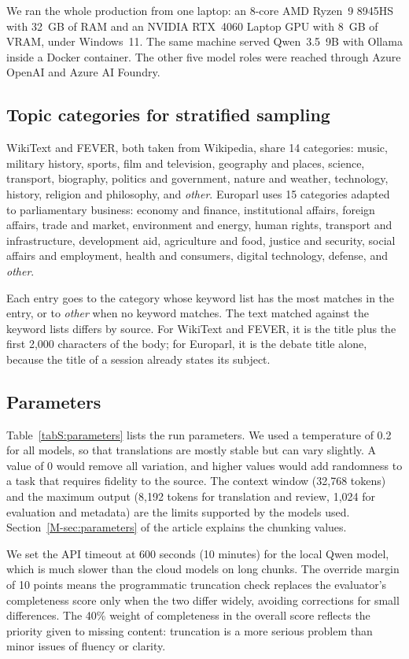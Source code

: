 \documentclass[11pt]{article}
\DeclareRobustCommand{\mainref}[1]{\ref*{M-#1}}
\begin{document}
We ran the whole production from one laptop: an 8-core AMD Ryzen~9 8945HS with 32~GB of RAM and an NVIDIA RTX~4060 Laptop GPU with 8~GB of VRAM, under Windows~11. The same machine served Qwen~3.5~9B with Ollama inside a Docker container. The other five model roles were reached through Azure OpenAI and Azure AI Foundry.

\subsection{Topic categories for stratified sampling}
\label{secS:topics}

WikiText and FEVER, both taken from Wikipedia, share 14 categories: music, military history, sports, film and television, geography and places, science, transport, biography, politics and government, nature and weather, technology, history, religion and philosophy, and \emph{other}. Europarl uses 15 categories adapted to parliamentary business: economy and finance, institutional affairs, foreign affairs, trade and market, environment and energy, human rights, transport and infrastructure, development aid, agriculture and food, justice and security, social affairs and employment, health and consumers, digital technology, defense, and \emph{other}.

Each entry goes to the category whose keyword list has the most matches in the entry, or to \emph{other} when no keyword matches. The text matched against the keyword lists differs by source. For WikiText and FEVER, it is the title plus the first 2,000 characters of the body; for Europarl, it is the debate title alone, because the title of a session already states its subject.

\subsection{Parameters}
\label{secS:parameters}

Table~\ref{tabS:parameters} lists the run parameters. We used a temperature of 0.2 for all models, so that translations are mostly stable but can vary slightly. A value of 0 would remove all variation, and higher values would add randomness to a task that requires fidelity to the source. The context window (32,768 tokens) and the maximum output (8,192 tokens for translation and review, 1,024 for evaluation and metadata) are the limits supported by the models used. Section~\mainref{sec:parameters} of the article explains the chunking values.

We set the API timeout at 600 seconds (10 minutes) for the local Qwen model, which is much slower than the cloud models on long chunks. The override margin of 10 points means the programmatic truncation check replaces the evaluator's completeness score only when the two differ widely, avoiding corrections for small differences. The 40\% weight of completeness in the overall score reflects the priority given to missing content: truncation is a more serious problem than minor issues of fluency or clarity.
\end{document}
